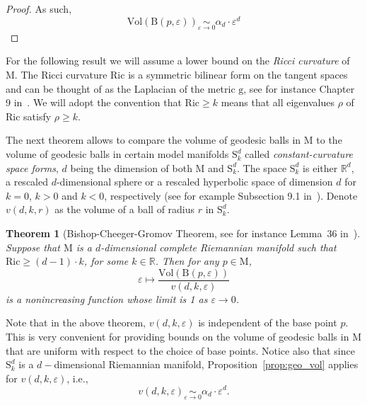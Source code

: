 \documentclass[pdflatex,sn-mathphys-ay]{sn-jnl}%
\newtheorem{theorem}{Theorem}[section]
\newcommand{\man}{\mathrm{M}}
\newcommand{\ball}{{\mathrm {B}}}
\newcommand{\vol}{\mathrm{Vol}}
\newcommand{\g}{\mathrm{g}}
\newcommand{\ricci}{\mathrm{Ric}}
\newcommand{\spaceform}{\mathrm{S}}
\newcommand{\R}{\mathbb{R}}
\newcommand{\eps}{\varepsilon}
\newcommand{\change}[1]{\noindent #1}
\theoremstyle{thmstyleone}%
\begin{document}
\begin{appendices}
\begin{proof}
As such,
$$\vol\left(\ball(p,\eps)\right)\underset{\eps\rightarrow 0}{\sim} \alpha_d\cdot\eps^d$$
\end{proof}

For the following result we will assume a lower bound on the {\it Ricci curvature} of $\man$. The Ricci curvature $\ricci$ is a symmetric bilinear form on the tangent spaces and can be thought of as the Laplacian of the metric $\g$, see for instance Chapter 9 in~\citet{petersen2006riemannian}. We will adopt the convention that $\ricci\geq k$ means that all eigenvalues $\rho$ of $\ricci$ satisfy $\rho\geq k$. 

The next theorem allows to compare the volume of geodesic balls in $\man$ to the volume of geodesic balls in certain model manifolds $\spaceform^d_k$ called {\it constant-curvature space forms}, $d$ being the dimension of both $\man$ and $\spaceform^d_k$. \change{The space $\spaceform^d_k$ is either $\mathbb{R}^d$, a rescaled $d$-dimensional sphere or a rescaled hyperbolic space of dimension $d$ for $k=0$, $k>0$ and $k<0$, respectively} (see for example \change{Subsection 9.1} in~\citet{petersen2006riemannian}).
Denote $v(d,k,r)$ as the volume of a ball of radius $r$ in $\spaceform^d_k$. 

\begin{theorem}[\change{Bishop-Cheeger-Gromov Theorem, see for instance Lemma~36 in~\citet{petersen2006riemannian}}]
\label{thm:bishop_gromov}
Suppose that $\man$ is a $d$-dimensional complete Riemannian manifold such that $\ricci\geq(d-1)\cdot k$, for some $k \in \R$. Then  for any $p \in \man$, 
$$\eps\longmapsto\frac{\vol\left(\ball(p,\eps)\right)}{v(d,k,\eps)} $$
is a nonincreasing function whose limit is 1 as $\eps\rightarrow 0$. 
\end{theorem}
 
Note that in the above theorem, $v(d,k,\eps)$ is independent of the base point $p$. %
This is very convenient for providing bounds on the volume of geodesic balls in $\man$ that are uniform with respect to the choice of base points. Notice also that since $\spaceform^d_k$ is a $d-$dimensional Riemannian manifold, Proposition~\ref{prop:geo_vol} applies for $v(d,k,\eps)$, i.e.,
$$v(d,k,\eps)\underset{\eps\rightarrow 0}{\sim} \alpha_d\cdot \eps^d.$$


\end{appendices}
\end{document}
